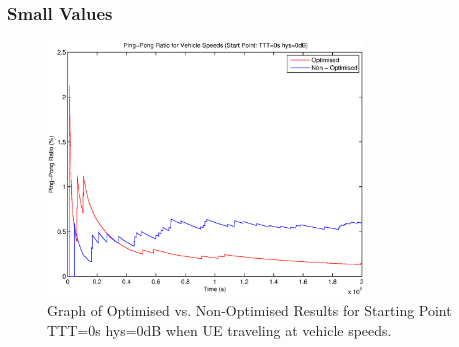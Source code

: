 \subsubsection*{Small Values}
\begin{figure}[H]
  \begin{center}
    	  \includegraphics[width=0.75\textwidth]{figures/vehicle_figures/low/long_ping.eps}
    \end{center}
    \caption{Graph of Optimised vs. Non-Optimised Results for Starting Point TTT=0s hys=0dB when UE traveling at vehicle speeds.}
    \label{fig:veh_low_drop}
\end{figure}

